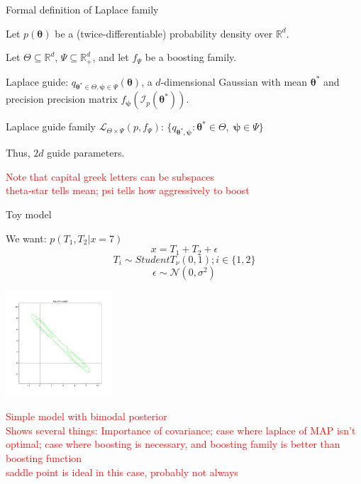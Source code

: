 \documentclass[
  ignorenonframetext,
]{beamer}
\begin{document}
\begin{frame}{Formal definition of Laplace family}
\protect\hypertarget{formal-definition-of-laplace-family}{}

Let \(p(\bm{\theta})\) be a (twice-differentiable) probability density
over \(\mathbb{R}^d\).

Let \(\Theta \subseteq \mathbb{R}^d\),
\(\Psi \subseteq \mathbb{R}^d_+\), and let \(f_\Psi\) be a boosting
family.

Laplace guide:
\(q_{\bm{\theta}^*\in\Theta,\bm{\psi}\in\Psi}(\bm{\theta})\), a
\(d\)-dimensional Gaussian with mean \(\bm{\theta}^*\) and precision
precision matrix
\(f_{\bm{\psi}} \left(\mathcal{I}_p(\bm{\theta}^*)\right)\).

Laplace guide family \(\mathcal{L}_{\Theta\times\Psi} (p,f_\Psi)\):
\(\{q_{\bm{\theta}^*,\bm{\psi}}:\bm{\theta}^*\in\Theta,\;\bm{\psi}\in\Psi\}\)

Thus, \(2d\) guide parameters.

\textcolor{red}{{\scriptsize Note that capital greek letters can be subspaces\\theta-star tells mean; psi tells how aggressively to boost}}

\end{frame}

\begin{frame}{Toy model}
\protect\hypertarget{toy-model}{}

We want: \(p(T_1,T_2|x=7)\) \[x= T_1+T_2+\epsilon\]
\[T_i\sim StudentT_{\nu}(0,1); i\in\{1,2\}\]
\[\epsilon\sim \mathcal{N}(0,\sigma^2)\]

\begin{center}\includegraphics[width=150px]{beforemeanfield} \end{center}

\textcolor{red}{{\scriptsize Simple model with bimodal posterior\\Shows several things: Importance of covariance; case where laplace of MAP isn't optimal; case where boosting is necessary, and boosting family is better than boosting function\\saddle point is ideal in this case, probably not always}}

\end{frame}
\end{document}
